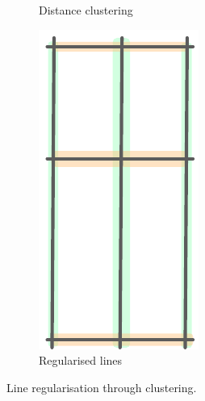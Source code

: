 \begin{figure}
\begin{subfigure}[b]{0.48\linewidth}
		\caption{Distance clustering}%
		\label{fig:lineclust:3}
	\end{subfigure}
\quad
	\begin{subfigure}[b]{0.48\linewidth}
		\includegraphics[angle=90,width=\linewidth]{figs/line-clustering/slice4.pdf}
		\caption{Regularised lines}%
		\label{fig:lineclust:4}
	\end{subfigure}	
	\caption{Line regularisation through clustering. }%
	\label{fig:lineclust}
\end{figure}

